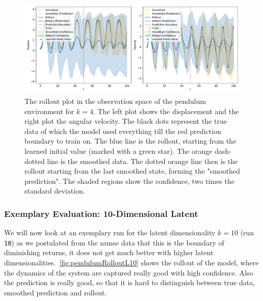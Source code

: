 			\begin{figure}
				\centering
				\includegraphics[width=\linewidth]{figures/results/pendulum/run-latent-dim-04/rollout-observations-N0.pdf}
				\caption{The rollout plot in the observation space of the pendulum environment for \(k = 4\). The left plot shows the displacement and the right plot the angular velocity. The black dots represent the true data of which the model used everything till the red prediction boundary to train on. The blue line is the rollout, starting from the learned initial value (marked with a green star). The orange dash-dotted line is the smoothed data. The dotted orange line then is the rollout starting from the last smoothed state, forming the "smoothed prediction". The shaded regions show the confidence, \ie two times the standard deviation.}
				\label{fig:pendulumRolloutL04}
			\end{figure}

		\subsubsection{Exemplary Evaluation: 10-Dimensional Latent}
			\label{subsubsec:pendulumL10}

			We will now look at an exemplary run for the latent dimensionality \( k = 10 \) (run \texttt{10}) as we postulated from the \ac{nrmse} data that this is the boundary of diminishing returns, \ie it does not get much better with higher latent dimensionalities.~\autoref{fig:pendulumRolloutL10} shows the rollout of the model, where the dynamics of the system are captured really good with high confidence. Also the prediction is really good, so that it is hard to distinguish between true data, smoothed prediction and rollout.

